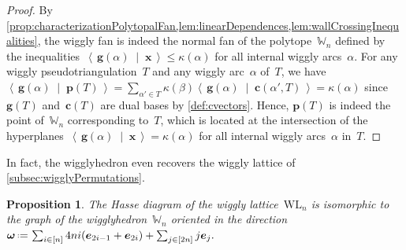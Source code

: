 \documentclass{amsart}
\newtheorem{proposition}[theorem]{Proposition}
\theoremstyle{definition}
\renewcommand{\b}[1]{{\boldsymbol{#1}}} %
\newcommand{\dotprod}[2]{\left\langle \, #1 \; \middle| \; #2 \, \right\rangle} %
\newcommand{\eqdef}{\mbox{\,\raisebox{0.2ex}{\scriptsize\ensuremath{\mathrm:}}\ensuremath{=}\,}} %
\newcommand{\polytope}[1]{\mathds{#1}} %
\newcommand{\wigglyLattice}{\mathrm{WL}} %
\newcommand{\wigglyhedron}{\polytope{W}} %
\begin{document}
\begin{proof}
By \cref{prop:characterizationPolytopalFan,lem:linearDependences,lem:wallCrossingInequalities}, the wiggly fan is indeed the normal fan of the polytope~$\wigglyhedron_n$ defined by the inequalities~$\dotprod{\b{g}(\alpha)}{\b{x}} \le \kappa(\alpha)$ for all internal wiggly arcs~$\alpha$.
For any wiggly pseudotriangulation~$T$ and any wiggly arc~$\alpha$ of~$T$, we have~$\dotprod{\b{g}(\alpha)}{\b{p}(T)} = \sum_{\alpha' \in T} \kappa(\beta) \dotprod{\b{g}(\alpha)}{\b{c}(\alpha', T)} = \kappa(\alpha)$ since~$\b{g}(T)$ and~$\b{c}(T)$ are dual bases by \cref{def:cvectors}.
Hence, $\b{p}(T)$ is indeed the point of~$\wigglyhedron_n$ corresponding to~$T$, which is located at the intersection of the hyperplanes~$\dotprod{\b{g}(\alpha)}{\b{x}} = \kappa(\alpha)$ for all internal wiggly arcs~$\alpha$ in~$T$.
\end{proof}

In fact, the wigglyhedron even recovers the wiggly lattice of \cref{subsec:wigglyPermutations}.

\begin{proposition}
The Hasse diagram of the wiggly lattice~$\wigglyLattice_n$ is isomorphic to the graph of the wigglyhedron~$\wigglyhedron_n$ oriented in the direction
\(
\b{\omega} \eqdef \sum_{i \in [n]} 4ni (\b{e}_{2i-1} + \b{e}_{2i}) + \sum_{j \in [2n]} j \b{e}_j.
\)
\end{proposition}
\end{document}
